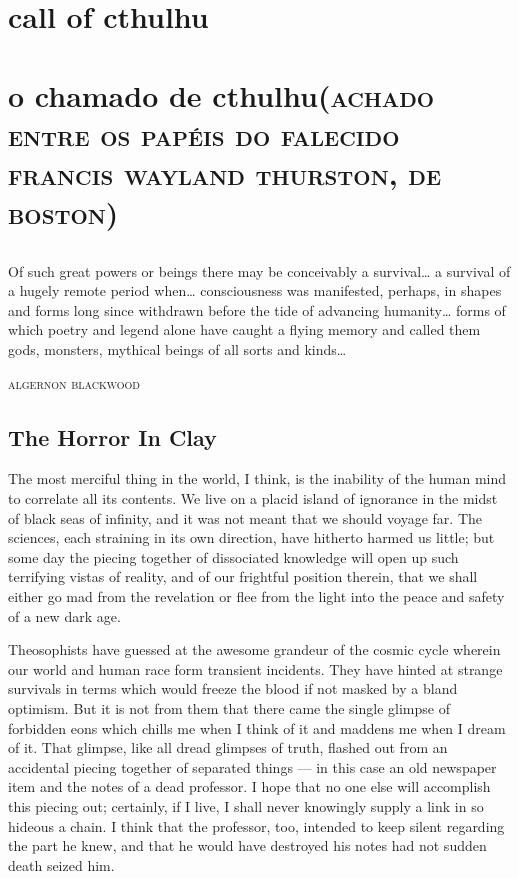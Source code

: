 \part{call of cthulhu}

\pagebreak

\part[o chamado de cthulhu]{o chamado de cthulhu\break\normalsize\textsc{(achado entre os papéis do falecido\\ francis wayland thurston, de boston)}}

\chapter*{}

\epigraph{Of such great powers or beings there may be conceivably a
survival\ldots{} a survival of a hugely remote period when\ldots{}
consciousness was manifested, perhaps, in shapes and forms long since
withdrawn before the tide of advancing humanity\ldots{} forms of which
poetry and legend alone have caught a flying memory and called them
gods, monsters, mythical beings of all sorts and kinds\ldots{}}{\textsc{algernon blackwood}}


\chapter*{The Horror In Clay}

\noindent{}The most merciful thing in the world, I think, is the inability of the
human mind to correlate all its contents. We live on a placid island of
ignorance in the midst of black seas of infinity, and it was not meant
that we should voyage far. The sciences, each straining in its own
direction, have hitherto harmed us little; but some day the piecing
together of dissociated knowledge will open up such terrifying vistas of
reality, and of our frightful position therein, that we shall either go
mad from the revelation or flee from the light into the peace and safety
of a new dark age.


Theosophists have guessed at the awesome grandeur of the cosmic cycle
wherein our world and human race form transient incidents. They have
hinted at strange survivals in terms which would freeze the blood if not
masked by a bland optimism. But it is not from them that there came the
single glimpse of forbidden eons which chills me when I think of it and
maddens me when I dream of it. That glimpse, like all dread glimpses of
truth, flashed out from an accidental piecing together of separated
things --- in this case an old newspaper item and the notes of a dead
professor. I hope that no one else will accomplish this piecing out;
certainly, if I live, I shall never knowingly supply a link in so
hideous a chain. I think that the professor, too, intended to keep
silent regarding the part he knew, and that he would have destroyed his
notes had not sudden death seized him.


